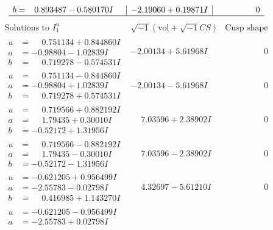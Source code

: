 \documentclass[1p]{elsarticle_modified}
\theoremstyle{definition}
\newcommand{\I}{\sqrt{-1}}
\begin{document}
$$\begin{array}{c|c|c}
\begin{aligned}
b &= \phantom{-}0.893487 - 0.580170 I\end{aligned}
 & -2.19060 + 0.19871 I & \phantom{-0.000000 } 0\\
 \hline 
 \end{array}$$\newpage$$\begin{array}{c|c|c}  
\text{Solutions to }I^u_{1}& \I (\text{vol} + \sqrt{-1}CS) & \text{Cusp shape}\\
 \hline 
\begin{aligned}
u &= \phantom{-}0.751134 + 0.844860 I \\
a &= -0.98804 - 1.02839 I \\
b &= \phantom{-}0.719278 - 0.574531 I\end{aligned}
 & -2.00134 + 5.61968 I & \phantom{-0.000000 } 0 \\ \hline\begin{aligned}
u &= \phantom{-}0.751134 - 0.844860 I \\
a &= -0.98804 + 1.02839 I \\
b &= \phantom{-}0.719278 + 0.574531 I\end{aligned}
 & -2.00134 - 5.61968 I & \phantom{-0.000000 } 0 \\ \hline\begin{aligned}
u &= \phantom{-}0.719566 + 0.882192 I \\
a &= \phantom{-}1.79435 + 0.30010 I \\
b &= -0.52172 + 1.31956 I\end{aligned}
 & \phantom{-}7.03596 + 2.38902 I & \phantom{-0.000000 } 0 \\ \hline\begin{aligned}
u &= \phantom{-}0.719566 - 0.882192 I \\
a &= \phantom{-}1.79435 - 0.30010 I \\
b &= -0.52172 - 1.31956 I\end{aligned}
 & \phantom{-}7.03596 - 2.38902 I & \phantom{-0.000000 } 0 \\ \hline\begin{aligned}
u &= -0.621205 + 0.956499 I \\
a &= -2.55783 - 0.02798 I \\
b &= \phantom{-}0.416985 + 1.143270 I\end{aligned}
 & \phantom{-}4.32697 - 5.61210 I & \phantom{-0.000000 } 0 \\ \hline\begin{aligned}
u &= -0.621205 - 0.956499 I \\
a &= -2.55783 + 0.02798 I \\

\end{aligned}
\end{array}$$
\end{document}
